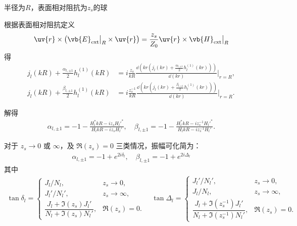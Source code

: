 \begin{exbox}
	半径为\(R\)，表面相对阻抗为\(z_s\)的球

	根据表面相对阻抗定义 \begin{align*}
		\uv{r} \times \left( \vb{E}_\text{ext}\big|_{R} \times \uv{r} \right) = \frac{z_s}{Z_0} \uv{r} \times \vb{H}_\text{ext}\big|_{R}
	\end{align*}
	得
	\begin{align*}
		j_l(kR)+\frac{\alpha_{l,\pm1}}{2}h_l^{(1)}(kR) & = i\frac{z_s}{kR}\frac{\dd(kr(j_l(kr)+\frac{\alpha_{l,\pm1}}{2}h_l^{(1)}(kr)))}{\dd(kr)}\bigg|_{r=R},     \\
		j_l(kR)+\frac{\beta_{l,\pm1}}{2}h_l^{(1)}(kR)  & = i\frac{z_s^{-1}}{kR}\frac{\dd(kr(j_l(kr)+\frac{\beta_{l,\pm1}}{2}h_l^{(1)}(kr)))}{\dd(kr)}\bigg|_{r=R}.
	\end{align*}

	解得
	\begin{align*}
		\alpha_{l,\pm1} = -1-\frac{H_l^*kR-iz_sH_l'^*}{H_lkR-iz_sH_l'}, \quad \beta_{l,\pm1} = -1-\frac{H_l^*kR-iz_s^{-1}H_l'^*}{H_lkR-iz_s^{-1}H_l'}.
	\end{align*}

	对于 \(z_s\to0\) 或 \(\infty\)，及 \(\Re(z_s)=0\) 三类情况，振幅可化简为：
	\begin{align*}
		\alpha_{l,\pm1}=-1+e^{2i\delta_{l}},\quad \beta_{l,\pm1}=-1+e^{2i\Delta_{l}}
	\end{align*}
	其中
	\begin{align*}
		\tan\delta_{l}=
		\begin{cases}
			J_l/N_l,                                    & z_s\to0,      \\
			J_l'/N_l',                                  & z_s\to\infty, \\
			\dfrac{J_l+\Im(z_s)J_l'}{N_l+\Im(z_s)N_l'}, & \Re(z_s)=0.
		\end{cases}\quad
		\tan\Delta_{l}=
		\begin{cases}
			J_l'/N_l',                                            & z_s\to0,      \\
			J_l/N_l,                                              & z_s\to\infty, \\
			\dfrac{J_l+\Im(z_s^{-1})J_l'}{N_l+\Im(z_s^{-1})N_l'}, & \Re(z_s)=0.
		\end{cases}
	\end{align*}


\end{exbox}
